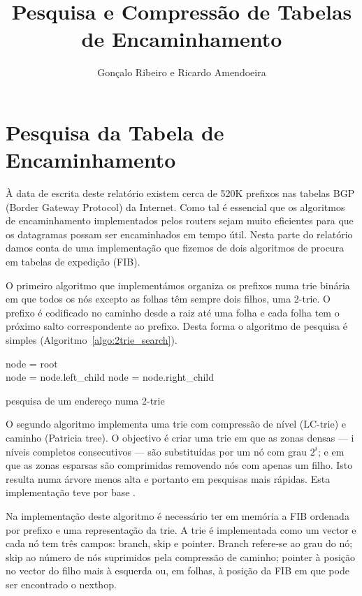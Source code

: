 \documentclass[10pt,a4paper]{article}
\author{Gonçalo Ribeiro e Ricardo Amendoeira}
\title{Pesquisa e Compressão de Tabelas de Encaminhamento}
\begin{document}
\maketitle
\section{Pesquisa da Tabela de Encaminhamento}
	À data de escrita deste relatório existem cerca de 520K prefixos nas tabelas BGP (Border Gateway Protocol) da Internet. Como tal é essencial que os algoritmos de encaminhamento implementados pelos routers sejam muito eficientes para que os datagramas possam ser encaminhados em tempo útil. Nesta parte do relatório damos conta de uma implementação que fizemos de dois algoritmos de procura em tabelas de expedição (FIB).

	O primeiro algoritmo que implementámos organiza os prefixos numa trie binária em que todos os nós excepto as folhas têm sempre dois filhos, uma \mbox{2-trie}. O prefixo é codificado no caminho desde a raiz até uma folha e cada folha tem o próximo salto correspondente ao prefixo. Desta forma o algoritmo de pesquisa é simples (Algoritmo~\ref{algo:2trie_search}).

\begin{algorithm}
	\label{algo:2trie_search}
	node = root\\
	{
		{
			{
				node = node.left\_child
			}
			\uElse
			{
				node = node.right\_child
			}
		}
		\uElse
		{
		}
	}
		\begin{comment}
			node = root
			for each bit in address, starting at MSB
				if node != leaf
					if bit == 0
						go to left child
					else
						go to right child
				else
					return node.interface
		\end{comment}
	\caption{pesquisa de um endereço numa 2-trie}
\end{algorithm}

	O segundo algoritmo implementa uma trie com compressão de nível (\mbox{LC-trie}) e caminho (Patricia tree). O objectivo é criar uma trie em que as zonas densas --- i níveis completos consecutivos --- são substituídas por um nó com grau $2^i$; e em que as zonas esparsas são comprimidas removendo nós com apenas um filho. Isto resulta numa árvore menos alta e portanto em pesquisas mais rápidas. Esta implementação teve por base \cite{SNilsson99}.

Na implementação deste algoritmo é necessário ter em memória a FIB ordenada por prefixo e uma representação da trie. A trie é implementada como um vector e cada nó tem três campos: branch, skip e pointer. Branch refere-se ao grau do nó; skip ao número de nós suprimidos pela compressão de caminho; pointer à posição no vector do filho mais à esquerda ou, em folhas, à posição da FIB em que pode ser encontrado o nexthop.
\end{document}
